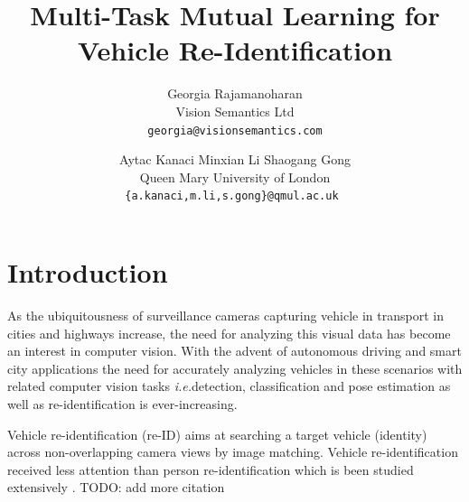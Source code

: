 \documentclass[10pt,twocolumn,letterpaper]{article}
\def\ie{\emph{i.e.\hspace{0.3em}}}
\newcommand{\todo}[1]{}
\renewcommand{\todo}[1]{{\color{red} TODO: {#1}}}
\begin{document}
\title{Multi-Task Mutual Learning for Vehicle Re-Identification}

\author{Georgia Rajamanoharan\\
Vision Semantics Ltd\\
{\tt\small georgia@visionsemantics.com}
\and
Aytac Kanaci \hspace{0.7cm}
Minxian Li  \hspace{0.7cm}
Shaogang Gong\\
Queen Mary University of London\\
{\tt\small \{a.kanaci,m.li,s.gong\}@qmul.ac.uk }
}

\maketitle

\begin{abstract}

\end{abstract}

\section{Introduction}

As the ubiquitousness of surveillance cameras capturing vehicle in transport in
cities and highways increase, the need for analyzing this visual data has
become an interest in computer vision. With the advent of autonomous driving
and smart city applications the need for accurately analyzing vehicles in these
scenarios with related computer vision tasks \ie detection, classification and
pose estimation as well as re-identification is ever-increasing.

Vehicle re-identification (re-ID) aims at searching a target vehicle
(identity) across non-overlapping camera views by image matching.  
Vehicle re-identification received less attention than person re-identification
which is been studied extensively \cite{gong2014re, Li2018Harmonious,
chen2017person}.\todo{add more citation}  
\end{document}
